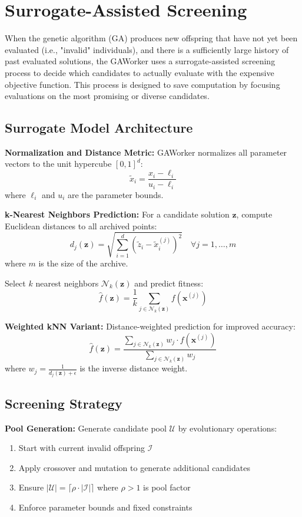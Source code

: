 \documentclass[12pt,a4paper]{article}
\begin{document}
\section{Surrogate-Assisted Screening}
When the genetic algorithm (GA) produces new offspring that have not yet been evaluated (i.e., "invalid" individuals), and there is a sufficiently large history of past evaluated solutions, the GAWorker uses a surrogate-assisted screening process to decide which candidates to actually evaluate with the expensive objective function. This process is designed to save computation by focusing evaluations on the most promising or diverse candidates.

\subsection{Surrogate Model Architecture}
\textbf{Normalization and Distance Metric:}
GAWorker normalizes all parameter vectors to the unit hypercube $[0,1]^d$:
\[
\tilde{x}_i = \frac{x_i - \ell_i}{u_i - \ell_i}
\]
where $\ell_i$ and $u_i$ are the parameter bounds.

\textbf{k-Nearest Neighbors Prediction:}
For a candidate solution $\bm{z}$, compute Euclidean distances to all archived points:
\[
d_j(\bm{z}) = \sqrt{\sum_{i=1}^d (\tilde{z}_i - \tilde{x}_i^{(j)})^2} \quad \forall j = 1, \dots, m
\]
where $m$ is the size of the archive.

Select $k$ nearest neighbors $\mathcal{N}_k(\bm{z})$ and predict fitness:
\[
\hat{f}(\bm{z}) = \frac{1}{k} \sum_{j \in \mathcal{N}_k(\bm{z})} f(\bm{x}^{(j)})
\]

\textbf{Weighted kNN Variant:}
Distance-weighted prediction for improved accuracy:
\[
\hat{f}(\bm{z}) = \frac{\sum_{j \in \mathcal{N}_k(\bm{z})} w_j \cdot f(\bm{x}^{(j)})}{\sum_{j \in \mathcal{N}_k(\bm{z})} w_j}
\]
where $w_j = \frac{1}{d_j(\bm{z}) + \epsilon}$ is the inverse distance weight.

\subsection{Screening Strategy}
\textbf{Pool Generation:}
Generate candidate pool $\mathcal{U}$ by evolutionary operations:
\begin{enumerate}
\item Start with current invalid offspring $\mathcal{I}$
\item Apply crossover and mutation to generate additional candidates
\item Ensure $|\mathcal{U}| = \lceil \rho \cdot |\mathcal{I}| \rceil$ where $\rho > 1$ is pool factor
\item Enforce parameter bounds and fixed constraints
\end{enumerate}
\end{document}
